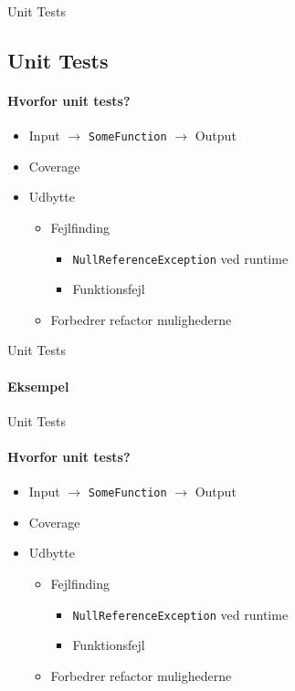 \begin{frame}{Unit Tests}
\subsection{Unit Tests}
\framesubtitle{Hvorfor unit tests?}

\begin{itemize}
	\item Input $\rightarrow$ \texttt{SomeFunction} $\rightarrow$  Output
	\item Coverage
	\item Udbytte
	\begin{itemize}
		\item Fejlfinding
		\begin{itemize}
			\item \texttt{NullReferenceException} ved runtime
			\item Funktionsfejl
		\end{itemize}
		\item Forbedrer refactor mulighederne
	\end{itemize}
\end{itemize}

\end{frame}
\begin{frame}{Unit Tests}
\framesubtitle{Eksempel}
\hbox{\hspace{5 mm}\scalebox{0.8}{
	  }} 

\end{frame}

\begin{frame}{Unit Tests}
\framesubtitle{Hvorfor unit tests?}

\begin{itemize}
	\item Input $\rightarrow$ \texttt{SomeFunction} $\rightarrow$  Output
	\item Coverage
	\item Udbytte
	\begin{itemize}
		\item Fejlfinding
				\begin{itemize}
					\item \texttt{NullReferenceException} ved runtime
					\item Funktionsfejl
				\end{itemize}
		\item Forbedrer refactor mulighederne
	\end{itemize}
\end{itemize}

\end{frame}
